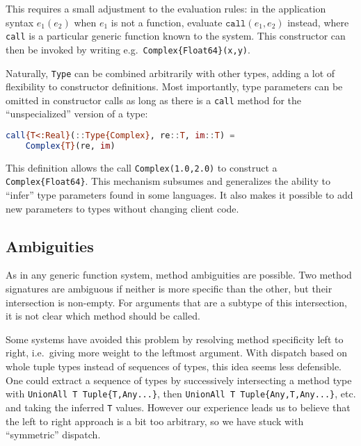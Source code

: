 \noindent
This requires a small adjustment to the evaluation rules: in the application
syntax $e_1(e_2)$ when $e_1$ is not a function,
evaluate $\texttt{call}(e_1,e_2)$ instead, where \texttt{call} is
a particular generic function known to the system.
This constructor can then be invoked by writing e.g.\ \texttt{Complex\{Float64\}(x,y)}.

Naturally, \texttt{Type} can be combined arbitrarily with other types,
adding a lot of flexibility to constructor definitions.
Most importantly, type parameters can be omitted in constructor calls
as long as there is a \texttt{call} method for the ``unspecialized'' version
of a type:

\begin{singlespace}
\begin{lstlisting}[language=julia]
call{T<:Real}(::Type{Complex}, re::T, im::T) =
    Complex{T}(re, im)
\end{lstlisting}
\end{singlespace}

This definition allows the call \texttt{Complex(1.0,2.0)} to
construct a \texttt{Complex\{Float64\}}.
This mechanism subsumes and generalizes the ability to ``infer''
type parameters found in some languages.
It also makes it possible to add new parameters to types without
changing client code.

\subsection{Ambiguities}

As in any generic function system, method ambiguities are possible.
Two method signatures are ambiguous if neither is more specific than
the other, but their intersection is non-empty.
For arguments that are a subtype of this intersection, it is not
clear which method should be called.

Some systems have avoided this problem by resolving method
specificity left to right, i.e.\ giving more weight to the leftmost
argument.
With dispatch based on whole tuple types instead of sequences of
types, this idea seems less defensible.
One could extract a sequence of types by successively
intersecting a method type with \texttt{UnionAll T Tuple\{T,Any...\}},
then \texttt{UnionAll T Tuple\{Any,T,Any...\}}, etc. and taking the
inferred \texttt{T} values.
However our experience leads us to believe that the left to right
approach is a bit too arbitrary, so we have stuck with ``symmetric''
dispatch.

